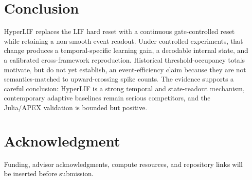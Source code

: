 \documentclass[journal]{IEEEtran}
\newcommand{\hlif}{HyperLIF}
\newcommand{\lif}{LIF}
\newcommand{\apex}{APEX}
\begin{document}
\section{Conclusion}
\hlif{} replaces the \lif{} hard reset with a continuous gate-controlled reset while retaining a non-smooth event readout. Under controlled experiments, that change produces a temporal-specific learning gain, a decodable internal state, and a calibrated cross-framework reproduction. Historical threshold-occupancy totals motivate, but do not yet establish, an event-efficiency claim because they are not semantics-matched to upward-crossing spike counts. The evidence supports a careful conclusion: \hlif{} is a strong temporal and state-readout mechanism, contemporary adaptive baselines remain serious competitors, and the Julia/\apex{} validation is bounded but positive.

\section*{Acknowledgment}
Funding, advisor acknowledgments, compute resources, and repository links will be inserted before submission.



\end{document}

